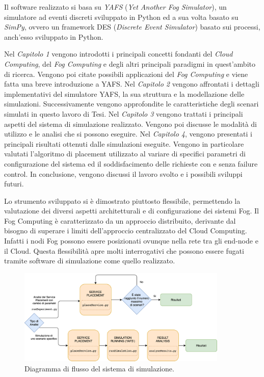 \documentclass[a4paper,11pt]{article}
\begin{document}
Il software realizzato si basa su \textit{YAFS} (\textit{Yet Another Fog Simulator}), un simulatore ad eventi discreti sviluppato in Python ed a sua volta basato su \textit{SimPy}, ovvero un framework DES (\textit{Discrete Event Simulator}) basato sui processi, anch'esso sviluppato in Python.

Nel \textit{Capitolo 1} vengono introdotti i principali concetti fondanti del \textit{Cloud Computing}, del \textit{Fog Computing} e degli altri principali paradigmi in quest'ambito di ricerca. Vengono poi citate possibili applicazioni del \textit{Fog Computing} e viene fatta una breve introduzione a YAFS. Nel \textit{Capitolo 2} vengono affrontati i dettagli implementativi del simulatore YAFS, la sua struttura e la modellazione delle simulazioni. Successivamente vengono approfondite le caratteristiche degli scenari simulati in questo lavoro di Tesi. Nel \textit{Capitolo 3} vengono trattati i principali aspetti del sistema di simulazione realizzato. Vengono poi discusse le modalità di utilizzo e le analisi che si possono eseguire. Nel \textit{Capitolo 4}, vengono presentati i principali risultati ottenuti dalle simulazioni eseguite. Vengono in particolare valutati l'algoritmo di placement utilizzato al variare di specifici parametri di configurazione del sistema ed il soddisfacimento delle richieste con e senza failure control. In conclusione, vengono discussi il lavoro svolto e i possibili sviluppi futuri.

Lo strumento sviluppato si è dimostrato piuttosto flessibile, permettendo la valutazione dei diversi aspetti architetturali e di configurazione dei sistemi Fog. Il Fog Computing è caratterizzato da un approccio distribuito, derivante dal bisogno di superare i limiti dell'approccio centralizzato del Cloud Computing. Infatti i nodi Fog possono essere posizionati ovunque nella rete tra gli end-node e il Cloud. Questa flessibilità apre molti interrogativi che possono essere fugati tramite software di simulazione come quello realizzato. 

\begin{figure}[!ht]
  \includegraphics[width=10cm]{images/sim_flow_diagram}
  \centering
  \caption{Diagramma di flusso del sistema di simulazione.}
  \label{fig:sim_flow_diagram}
\end{figure}
\end{document}
